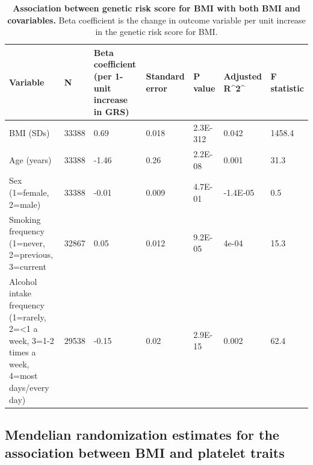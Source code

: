 \documentclass[11pt,twoside]{bristolthesis}
\begin{document}
\begin{landscape}\begin{table}

\caption[Association between genetic risk score for BMI with both BMI and covariables]{\label{tab:INT-GRS-confounders-platelets}\textbf{Association between genetic risk score for BMI with both BMI and covariables.} Beta coefficient is the change in outcome variable per unit increase in the genetic risk score for BMI.}
\centering
\begin{tabu} to 
\toprule
Variable & N & Beta coefficient (per 1-unit increase in GRS) & Standard error & P value & Adjusted R\textasciicircum{}2\textasciicircum{} & F statistic\\
\midrule
BMI (SDs) & 33388 & 0.69 & 0.018 & 2.3E-312 & 0.042 & 1458.4\\
Age (years) & 33388 & -1.46 & 0.26 & 2.2E-08 & 0.001 & 31.3\\
Sex (1=female, 2=male) & 33388 & -0.01 & 0.009 & 4.7E-01 & -1.4E-05 & 0.5\\
Smoking frequency (1=never, 2=previous, 3=current & 32867 & 0.05 & 0.012 & 9.2E-05 & 4e-04 & 15.3\\
Alcohol intake frequency (1=rarely, 2=<1 a week, 3=1-2 times a week, 4=most days/every day) & 29538 & -0.15 & 0.02 & 2.9E-15 & 0.002 & 62.4\\
\bottomrule
\end{tabu}
\end{table}
\end{landscape}
\hypertarget{mendelian-randomization-estimates-for-the-association-between-bmi-and-platelet-traits}{%
\subsection{Mendelian randomization estimates for the association between BMI and platelet traits}\label{mendelian-randomization-estimates-for-the-association-between-bmi-and-platelet-traits}}
\end{document}

